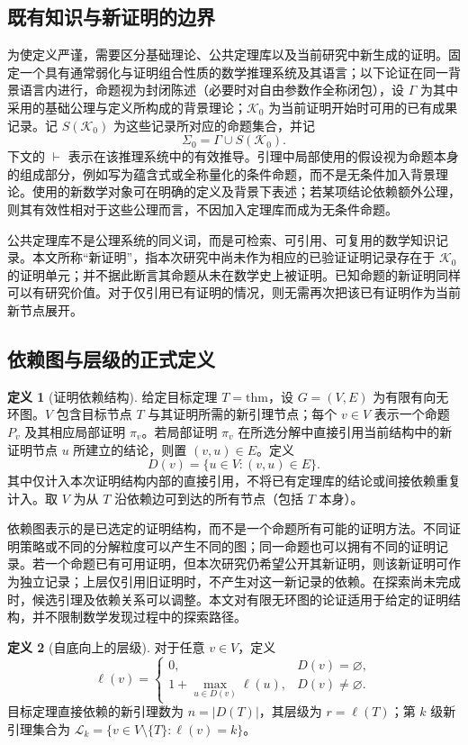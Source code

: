 \documentclass[UTF8,11pt,a4paper,fontset=fandol]{ctexart}
\theoremstyle{definition}\newtheorem{definition}{定义}
\newcommand{\K}{\mathcal K}
\newcommand{\Lset}{\mathcal L}
\begin{document}
\subsection{既有知识与新证明的边界}
为使定义严谨，需要区分基础理论、公共定理库以及当前研究中新生成的证明。固定一个具有通常弱化与证明组合性质的数学推理系统及其语言；以下论证在同一背景语言内进行，命题视为封闭陈述（必要时对自由参数作全称闭包），设 $\Gamma$ 为其中采用的基础公理与定义所构成的背景理论；$\K_0$ 为当前证明开始时可用的已有成果记录。记 $S(\K_0)$ 为这些记录所对应的命题集合，并记
\[
 \Sigma_0=\Gamma\cup S(\K_0).
\]
下文的 $\vdash$ 表示在该推理系统中的有效推导。引理中局部使用的假设视为命题本身的组成部分，例如写为蕴含式或全称量化的条件命题，而不是无条件加入背景理论。使用的新数学对象可在明确的定义及背景下表述；若某项结论依赖额外公理，则其有效性相对于这些公理而言，不因加入定理库而成为无条件命题。

公共定理库不是公理系统的同义词，而是可检索、可引用、可复用的数学知识记录。本文所称“新证明”，指本次研究中尚未作为相应的已验证证明记录存在于 $\K_0$ 的证明单元；并不据此断言其命题从未在数学史上被证明。已知命题的新证明同样可以有研究价值。对于仅引用已有证明的情况，则无需再次把该已有证明作为当前新节点展开。

\subsection{依赖图与层级的正式定义}
\begin{definition}[证明依赖结构]
给定目标定理 $T=\mathrm{thm}$，设 $G=(V,E)$ 为有限有向无环图。$V$ 包含目标节点 $T$ 与其证明所需的新引理节点；每个 $v\in V$ 表示一个命题 $P_v$ 及其相应局部证明 $\pi_v$。若局部证明 $\pi_v$ 在所选分解中直接引用当前结构中的新证明节点 $u$ 所建立的结论，则置 $(v,u)\in E$。定义
\[
 D(v)=\{u\in V:(v,u)\in E\}.
\]
其中仅计入本次证明结构内部的直接引用，不将已有定理库的结论或间接依赖重复计入。取 $V$ 为从 $T$ 沿依赖边可到达的所有节点（包括 $T$ 本身）。
\end{definition}

依赖图表示的是已选定的证明结构，而不是一个命题所有可能的证明方法。不同证明策略或不同的分解粒度可以产生不同的图；同一命题也可以拥有不同的证明记录。若一个命题已有可用证明，但本次研究仍希望公开其新证明，则该新证明可作为独立记录；上层仅引用旧证明时，不产生对这一新记录的依赖。在探索尚未完成时，候选引理及依赖关系可以调整。本文对有限无环图的论证适用于给定的证明结构，并不限制数学发现过程中的探索路径。

\begin{definition}[自底向上的层级]
对于任意 $v\in V$，定义
\begin{equation}\label{eq:level}
 \boxed{\ell(v)=\begin{cases}
 0,&D(v)=\varnothing,\\[3pt]
 1+\displaystyle\max_{u\in D(v)}\ell(u),&D(v)\ne\varnothing.
 \end{cases}}
\end{equation}
目标定理直接依赖的新引理数为 $n=|D(T)|$，其层级为 $r=\ell(T)$；第 $k$ 级新引理集合为 $\Lset_k=\{v\in V\setminus\{T\}:\ell(v)=k\}$。
\end{definition}
\end{document}
